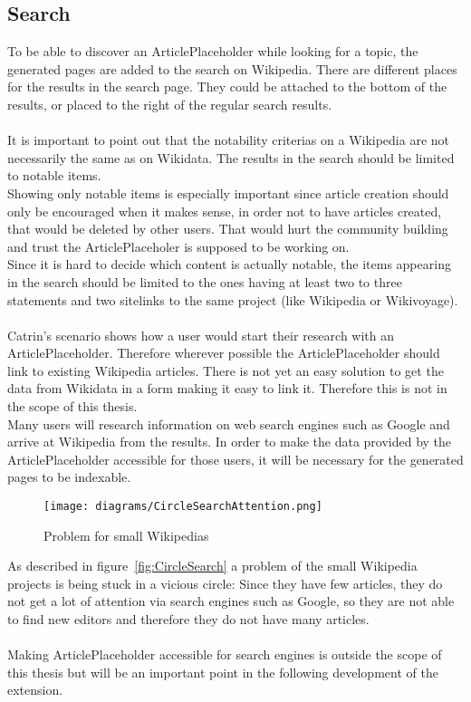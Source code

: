 \subsection{Search}
To be able to discover an ArticlePlaceholder while looking for a topic, the generated pages are added to the search on Wikipedia. There are different places for the results in the search page. They could be attached to the bottom of the results, or placed to the right of the regular search results. \\
\\
It is important to point out that the notability criterias on a Wikipedia are not necessarily the same as on Wikidata. The results in the search should be limited to notable items. \\
Showing only notable items is especially important since article creation should only be encouraged when it makes sense, in order not to have articles created, that would be deleted by other users. That would hurt the community building and trust the ArticlePlaceholer is supposed to be working on. \\
Since it is hard to decide which content is actually notable, the items appearing in the search should be limited to the ones having at least two to three statements and two sitelinks to the same project (like Wikipedia or Wikivoyage). \\
\\
Catrin's scenario shows how a user would start their research with an ArticlePlaceholder. Therefore wherever possible the ArticlePlaceholder should link to existing Wikipedia articles. There is not yet an easy solution to get the data from Wikidata in a form making it easy to link it. Therefore this is not in the scope of this thesis.
\\
Many users will research information on web search engines such as Google and arrive at Wikipedia from the results. In order to make the data provided by the ArticlePlaceholder accessible for those users, it will be necessary for the generated pages to be indexable.
\begin{figure}[H]\label{fig:CircleSearch}
	\centering
	\texttt{[image: diagrams/CircleSearchAttention.png]}
	\caption{Problem for small Wikipedias}
	\label{diagramCircleSearch}
\end{figure}
As described in figure~\ref{fig:CircleSearch} a problem of the small Wikipedia projects is being stuck in a vicious circle: Since they have few articles, they do not get a lot of attention via search engines such as Google, so they are not able to find new editors and therefore they do not have many articles. \\
\\
Making ArticlePlaceholder accessible for search engines is outside the scope of this thesis but will be an important point in the following development of the extension. 

